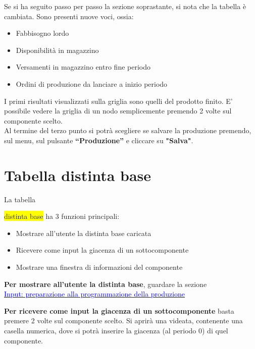 \documentclass[12pt,twoside]{report}
\begin{document}
Se si ha seguito passo per passo la sezione soprastante, si nota che la tabella è cambiata.
Sono presenti nuove voci, ossia:
\begin{itemize}
	
	\item Fabbisogno lordo
	\item Disponibilità in magazzino
	\item Versamenti in magazzino entro fine periodo 
	\item Ordini di produzione da lanciare a inizio periodo
	      
\end{itemize}

I primi risultati visualizzati sulla griglia sono quelli del prodotto finito. E' possibile vedere la griglia di un nodo semplicemente premendo 2 volte sul componente scelto.\\

Al termine del terzo punto si potrà scegliere se salvare la produzione premendo, sul menu, sul pulsante \textbf{“Produzione”} e cliccare su \textbf{"Salva"}.



\section{Tabella distinta base}

\hypertarget{tabDistintaBase}{La tabella} \colorbox{yellow}{distinta base} ha 3 funzioni principali:

\begin{itemize}
	
	\item Mostrare all'utente la distinta base caricata
	\item Ricevere come input la giacenza di un sottocomponente
	\item Mostrare una finestra di informazioni del componente\\
	      	
\end{itemize}

\textbf{Per mostrare all'utente la distinta base}, guardare la sezione\\ \hyperlink{inputProduzione}{\textcolor{blue}{\underline{Input: preparazione alla programmazione della produzione}}}

\bigskip
\textbf{Per ricevere come input la giacenza di un sottocomponente} basta premere 2 volte sul componente scelto. Si aprirà una videata, contenente una casella numerica, dove si potrà inserire la giacenza (al periodo 0) di quel componente.
\end{document}
